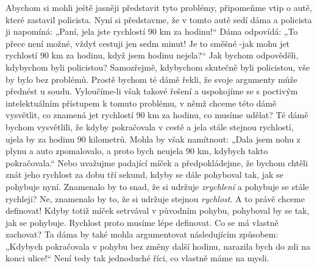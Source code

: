 {    Abychom si mohli ještě jasněji představit tyto problémy, připomeňme vtip o autě, které zastavil 
    policista. Nyní si představme, že v tomto autě sedí dáma a policista ji napomíná: „Paní, jela 
    jste rychlostí \num{90} km za hodinu!“ Dáma odpovídá: „To přece není možné, vždyť cestuji jen 
    sedm minut! Je to směšné -jak mohu jet rychlostí \num{90} km za hodinu, když jsem hodinu 
    nejela?“ Jak bychom odpověděli, kdybychom byli policistou? Samozřejmě, kdybychom skutečně byli 
    policistou, vše by bylo bez problémů. Prostě bychom té dámě řekli, že svoje argumenty může 
    přednést u soudu. Vyloučíme-li však takové řešení a uspokojíme se s poctivým intelektuálním 
    přístupem k tomuto problému, v němž chceme této dámě vysvětlit, co znamená jet rychlostí 
    \num{90} km za hodinu, co musíme udělat? Té dámě bychom vysvětlili, že kdyby pokračovala v 
    cestě a jela stále stejnou rychlostí, ujela by za hodinu \num{90} kilometrů. Mohla by však 
    namítnout: „Dala jsem nohu z plynu a auto zpomalovalo, a proto bych neujela \num{90} km, 
    kdybych takto pokračovala.“ Nebo uvažujme padající míček a předpokládejme, že bychom chtěli 
    znát jeho rychlost za dobu tří sekund, kdyby se dále pohyboval tak, jak se pohybuje nyní. 
    Znamenalo by to snad, že si udržuje \emph{zrychlení} a pohybuje se stále rychleji? Ne, 
    znamenalo by to, že si udržuje stejnou \emph{rychlost}. A to právě chceme definovat! Kdyby 
    totiž míček setrvával v původním pohybu, pohyboval by se tak, jak se pohybuje. Rychlost proto 
    musíme lépe definovat. Co se má vlastně zachovat? Ta dáma by také mohla argumentovat 
    následujícím způsobem: „Kdybych pokračovala v pohybu bez změny další hodinu, narazila bych do 
    zdi na konci ulice!“ Není tedy tak jednoduché říci, co vlastně máme na mysli.
    
}
